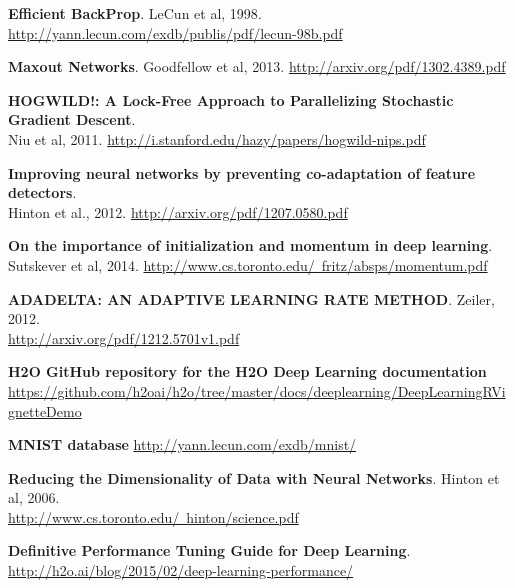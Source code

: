 \documentclass{article}[11pt]
\begin{document}
\textbf{Efficient BackProp}.  {LeCun et al, 1998}. {\url{http://yann.lecun.com/exdb/publis/pdf/lecun-98b.pdf}}

\textbf{Maxout Networks}. {Goodfellow et al, 2013}.  {\url{http://arxiv.org/pdf/1302.4389.pdf}}

\textbf{HOGWILD!: A Lock-Free Approach to Parallelizing Stochastic Gradient Descent}.  \\
{Niu et al, 2011}.  {\url{http://i.stanford.edu/hazy/papers/hogwild-nips.pdf}}

\textbf{Improving neural networks by preventing co-adaptation of feature detectors}.  \\
{Hinton et al., 2012}.  \href{http://arxiv.org/pdf/1207.0580.pdf}{http://arxiv.org/pdf/1207.0580.pdf}

\textbf{On the importance of initialization and momentum in deep learning}.  {Sutskever et al, 2014}.  \href{http://www.cs.toronto.edu/~fritz/absps/momentum.pdf}{http://www.cs.toronto.edu/~fritz/absps/momentum.pdf}

\textbf{ADADELTA: AN ADAPTIVE LEARNING RATE METHOD}. {Zeiler, 2012}.  \\
 \href{http://arxiv.org/pdf/1212.5701v1.pdf}{http://arxiv.org/pdf/1212.5701v1.pdf}

\textbf{H2O GitHub repository for the H2O Deep Learning documentation} \\
 \href{https://github.com/h2oai/h2o/tree/master/docs/deeplearning/DeepLearningRVignetteDemo}{https://github.com/h2oai/h2o/tree/master/docs/deeplearning/DeepLearningRVignetteDemo}

\textbf{{MNIST database}}  \href{http://yann.lecun.com/exdb/mnist/}{http://yann.lecun.com/exdb/mnist/}

\textbf{Reducing the Dimensionality of
Data with Neural Networks}.  {Hinton et al, 2006}. \\
 \href{http://www.cs.toronto.edu/~hinton/science.pdf}{http://www.cs.toronto.edu/~hinton/science.pdf}

\textbf{Definitive Performance Tuning Guide for Deep Learning}. \href{http://h2o.ai/blog/2015/02/deep-learning-performance/}{http://h2o.ai/blog/2015/02/deep-learning-performance/}
\end{document}
